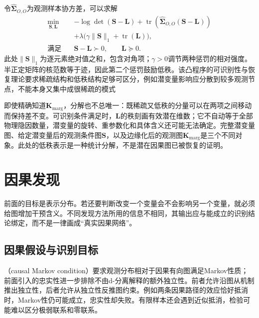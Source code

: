 令$\widehat{\bm{\Sigma}}_{O,O}$为观测样本协方差，可以求解
\begin{equation}
  \begin{aligned}
    \min_{\bm{S},\bm{L}}\quad&
      -\log\det(\bm{S}-\bm{L})
      +\operatorname{tr}\!\left(
           \widehat{\bm{\Sigma}}_{O,O}(\bm{S}-\bm{L})\right)\\
      &+\lambda\bigl(\gamma\lVert\bm{S}\rVert_1
                      +\operatorname{tr}(\bm{L})\bigr),\\
    \text{满足}\quad&\bm{S}-\bm{L}\succ0,\qquad \bm{L}\succeq0.
  \end{aligned}
  \label{eq:pgm-structure-learning-sparse-low-rank}
\end{equation}
此处$\lVert\bm{S}\rVert_1$为逐元素绝对值之和，包含对角项；$\gamma>0$调节两种惩罚的相对强度。半正定矩阵的核范数等于迹，因此第二个惩罚鼓励低秩。该凸程序的可识别性与恢复理论要求稀疏结构和低秩结构足够可区分，例如潜变量影响应分散到较多观测节点，不能本身又集中成很稀疏的模式

即使精确知道$\bm{K}_{\mathrm{marg}}$，分解也不总唯一：既稀疏又低秩的分量可以在两项之间移动而保持差不变。可识别条件满足时，$\bm{L}$的秩刻画有效潜在维数；它不自动等于全部物理隐因数量，潜变量的旋转、重参数化和具体含义还可能无法确定。完整潜变量图、给定潜变量后的观测条件图$\bm{S}$，以及边缘化后的观测图$\bm{K}_{\mathrm{marg}}$是三个不同对象。此处的低秩表示是一种统计分解，不是潜在因果图已被恢复的证明。

\section{因果发现}
\label{sec:pgm-structure-learning-causal}

前面的目标是表示分布。若还要判断改变一个变量会不会影响另一个变量，就必须给图增加干预含义。不同发现方法所用的信息不相同，其输出应与能成立的识别结论绑定，而不是一律画成“真实因果网络”。

\subsection{因果假设与识别目标}
\label{sec:pgm-structure-learning-causal-assumptions}

（causal Markov condition）要求观测分布相对于因果有向图满足Markov性质；前面引入的忠实性进一步排除不由d-分离解释的额外独立性。前者允许沿图从机制推出独立性，后者允许从独立性反推图约束。例如两条因果路径的效应恰好抵消时，Markov性仍可能成立，忠实性却失败。有限样本还会遇到近似抵消，检验可能难以区分极弱联系和零联系。

